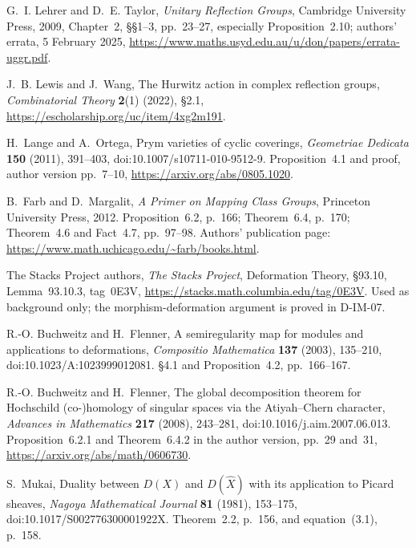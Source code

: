 
G.~I. Lehrer and D.~E. Taylor,
\emph{Unitary Reflection Groups}, Cambridge University Press, 2009,
Chapter~2, \S\S1--3, pp.~23--27, especially Proposition~2.10;
authors' errata, 5 February 2025,
\url{https://www.maths.usyd.edu.au/u/don/papers/errata-uggr.pdf}.

J.~B. Lewis and J.~Wang,
The Hurwitz action in complex reflection groups,
\emph{Combinatorial Theory} \textbf{2}(1) (2022), \S2.1,
\url{https://escholarship.org/uc/item/4xg2m191}.

H.~Lange and A.~Ortega,
Prym varieties of cyclic coverings,
\emph{Geometriae Dedicata} \textbf{150} (2011), 391--403,
doi:10.1007/s10711-010-9512-9.
Proposition~4.1 and proof, author version pp.~7--10,
\url{https://arxiv.org/abs/0805.1020}.

B.~Farb and D.~Margalit,
\emph{A Primer on Mapping Class Groups}, Princeton University Press, 2012.
Proposition~6.2, p.~166; Theorem~6.4, p.~170;
Theorem~4.6 and Fact~4.7, pp.~97--98.
Authors' publication page:
\url{https://www.math.uchicago.edu/~farb/books.html}.

The Stacks Project authors,
\emph{The Stacks Project}, Deformation Theory, \S93.10,
Lemma~93.10.3, tag~0E3V,
\url{https://stacks.math.columbia.edu/tag/0E3V}.
Used as background only; the morphism-deformation argument is proved in
D-IM-07.

R.-O. Buchweitz and H.~Flenner,
A semiregularity map for modules and applications to deformations,
\emph{Compositio Mathematica} \textbf{137} (2003), 135--210,
doi:10.1023/A:1023999012081.
\S4.1 and Proposition~4.2, pp.~166--167.

R.-O. Buchweitz and H.~Flenner,
The global decomposition theorem for Hochschild (co-)homology of singular
spaces via the Atiyah--Chern character,
\emph{Advances in Mathematics} \textbf{217} (2008), 243--281,
doi:10.1016/j.aim.2007.06.013.
Proposition~6.2.1 and Theorem~6.4.2 in the author version,
pp.~29 and~31,
\url{https://arxiv.org/abs/math/0606730}.

S.~Mukai,
Duality between $D(X)$ and $D(\widehat X)$ with its application to
Picard sheaves,
\emph{Nagoya Mathematical Journal} \textbf{81} (1981), 153--175,
doi:10.1017/S002776300001922X.
Theorem~2.2, p.~156, and equation~(3.1), p.~158.

